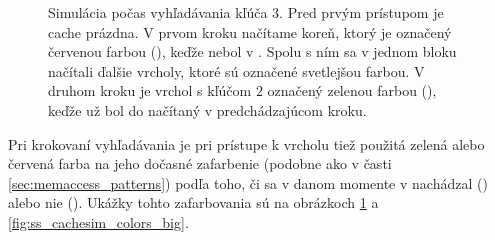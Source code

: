 \begin{figure}
    \centering
    \hspace{1cm}
    \hspace{1cm}
    \caption[Simulácia \cache počas vyhľadávania kľúča $3$]{Simulácia \cache počas vyhľadávania kľúča $3$. Pred prvým prístupom je cache prázdna. V prvom kroku načítame koreň, ktorý je označený červenou farbou (\miss), keďže nebol v \cache. Spolu s ním sa v jednom bloku načítali ďalšie vrcholy, ktoré sú označené svetlejšou farbou. V druhom kroku je vrchol s kľúčom $2$ označený zelenou farbou (\hit), keďže už bol do \cache načítaný v predchádzajúcom kroku.}
    \label{fig:ss_cachesim_colors}
\end{figure}

Pri krokovaní vyhľadávania je pri prístupe k vrcholu tiež použitá zelená alebo červená farba na jeho dočasné zafarbenie (podobne ako v časti \ref{sec:memaccess_patterns}) podľa toho, či sa v danom momente v \cache nachádzal (\hit) alebo nie (\miss). Ukážky tohto zafarbovania sú na obrázkoch \ref{fig:ss_cachesim_colors} a \ref{fig:ss_cachesim_colors_big}.

